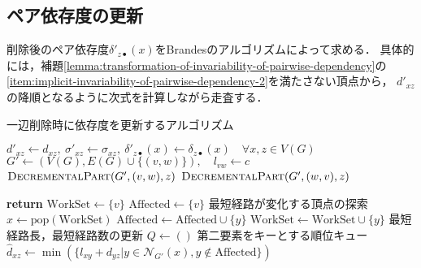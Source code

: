 \subsection{ペア依存度の更新}
\label{subsect:update-delta-on-delete}

削除後のペア依存度$\delta'_{z\bullet}(x)$をBrandesのアルゴリズムによって求める．
具体的には，補題\ref{lemma:transformation-of-invariability-of-pairwise-dependency}の
\ref{item:implicit-invariability-of-pairwise-dependency-2}を満たさない頂点から，
$d'_{xz}$の降順となるように次式を計算しながら走査する．

\begin{algorithm}[tbp]
  \caption{一辺削除時に依存度を更新するアルゴリズム}
  \label{algo:decremental-algorithm}
  \begin{algorithmic}[1]\scriptsize
    \State $d'_{xz}\gets d_{xz},\:\sigma'_{xz}\gets \sigma_{xz},\:\delta'_{z\bullet}(x)\gets \delta_{z\bullet}(x)\quad\forall x,z\in V(G)$
    \State $G'\gets(V(G),E(G)\cup\{(v,w)\}),\quad l_{vw}\gets c$
    \State $\textsc{DecrementalPart}(G',(v,w),z)$
    \Else
    \State $\textsc{DecrementalPart}(G',(w,v),z)$
    \EndIf
    \EndFor
    \EndProcedure
  \end{algorithmic}
  \vspace{-1em}
  \begin{multicols}{2}
    \begin{algorithmic}[1]\scriptsize
      \makeatletter
      \setcounter{ALG@line}{11}
      \makeatother
      \State \textbf{return}
      \EndIf
      \State $\mathrm{WorkSet}\gets\{v\}$
      \State $\mathrm{Affected}\gets\{v\}$
      \State
      \State \LeftComment 最短経路が変化する頂点の探索
      \State $x\gets\mathrm{pop}(\mathrm{WorkSet})$
      \State $\mathrm{Affected}\gets\mathrm{Affected}\cup\{y\}$
      \State $\mathrm{WorkSet}\gets\mathrm{WorkSet}\cup\{y\}$
      \EndIf
      \EndFor
      \EndWhile
      \State
      \State \LeftComment 最短経路長，最短経路数の更新
      \State $Q\gets()$ \Comment 第二要素をキーとする順位キュー
      \State $\hat{d}_{xz}\gets\min(\{l_{xy}+d_{yz}\vert y\in\mathcal{N}_{G'}(x),y\notin\mathrm{Affected}\})$

\end{algorithmic}
\end{multicols}
\end{algorithm}
